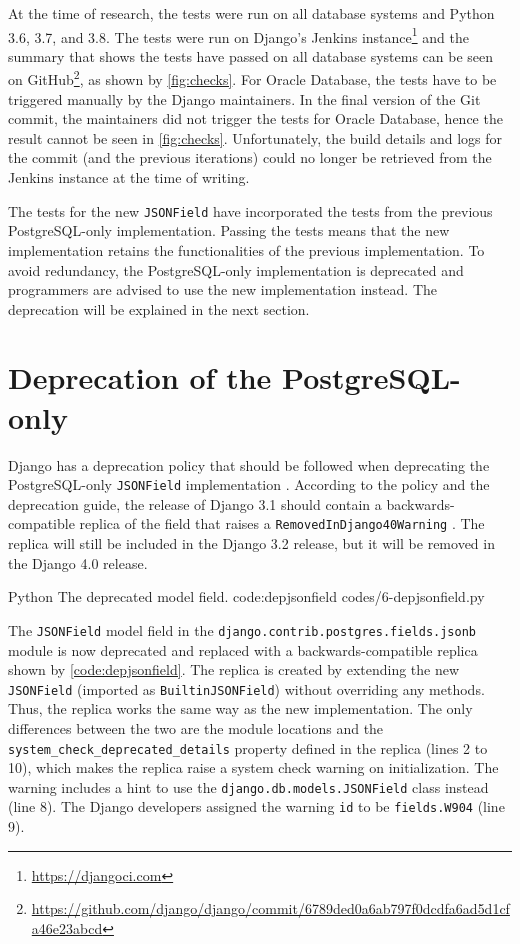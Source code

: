 At the time of research, the tests were run on all database systems and Python
3.6, 3.7, and 3.8. The tests were run on Django's Jenkins
instance\footnote{\url{https://djangoci.com}} and the summary that shows the
tests have passed on all database systems can be seen on
GitHub\footnote{\url{https://github.com/django/django/commit/6789ded0a6ab797f0dcdfa6ad5d1cfa46e23abcd}},
as shown by \autoref{fig:checks}. For Oracle Database, the tests have to be
triggered manually by the Django maintainers. In the final version of the Git
commit, the maintainers did not trigger the tests for Oracle Database, hence
the result cannot be seen in \autoref{fig:checks}. Unfortunately, the build
details and logs for the commit (and the previous iterations) could no longer
be retrieved from the Jenkins instance at the time of writing.

The tests for the new \verb|JSONField| have incorporated the tests from the
previous PostgreSQL-only implementation. Passing the tests means that the new
implementation retains the functionalities of the previous implementation.
To avoid redundancy, the PostgreSQL-only implementation is deprecated and
programmers are advised to use the new implementation instead. The deprecation
will be explained in the next section.

\section{Deprecation of the PostgreSQL-only }

Django has a deprecation policy that should be followed when deprecating the
PostgreSQL-only \verb|JSONField| implementation
\cite{django:deprecation-policy}. According to the policy and the deprecation
guide, the release of Django 3.1 should contain a backwards-compatible replica
of the field that raises a \verb|RemovedInDjango40Warning|
\cite{django:deprecation-guide}. The replica will still be included in the
Django 3.2 release, but it will be removed in the Django 4.0 release.

\listing
{Python}
{The deprecated  model field.}
{code:depjsonfield}
{codes/6-depjsonfield.py}

The \verb|JSONField| model field in the
\verb|django.contrib.postgres.fields.jsonb| module is now deprecated and
replaced with a backwards-compatible replica shown by
\autoref{code:depjsonfield}. The replica is created by extending the new
\verb|JSONField| (imported as \verb|BuiltinJSONField|) without overriding any
methods. Thus, the replica works the same way as the new implementation. The
only differences between the two are the module locations and the
\verb|system_check_deprecated_details| property defined in the replica (lines 2
to 10), which makes the replica raise a system check warning on initialization.
The warning includes a hint to use the \verb|django.db.models.JSONField| class
instead (line 8). The Django developers assigned the warning \verb|id| to be
\verb|fields.W904| (line 9).

